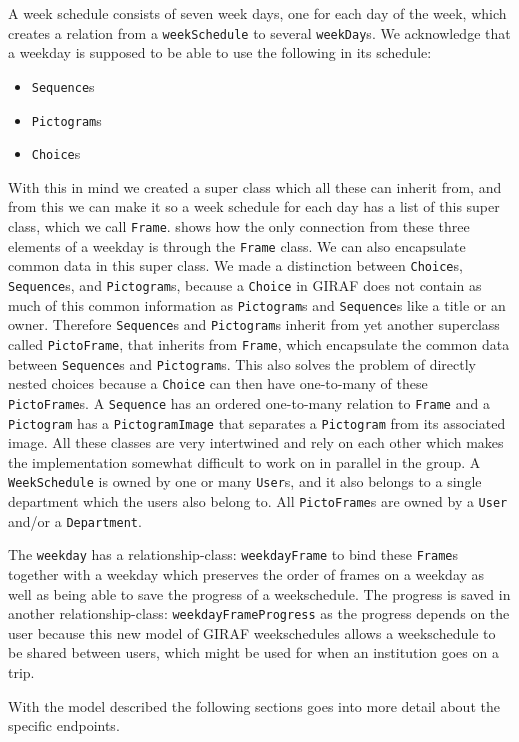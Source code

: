 A week schedule consists of seven week days, one for each day of the week, which creates a relation from a \texttt{weekSchedule} to several \texttt{weekDay}s.
We acknowledge that a weekday is supposed to be able to use the following in its schedule: 

\begin{itemize}
	\item \texttt{Sequence}s
	\item \texttt{Pictogram}s
	\item \texttt{Choice}s
\end{itemize}

With this in mind we created a super class which all these can inherit from, and from this we can make it so a week schedule for each day has a list of this super class, which we call \texttt{Frame}.
 shows how the only connection from these three elements of a weekday is through the \texttt{Frame} class.
We can also encapsulate common data in this super class.
We made a distinction between \texttt{Choice}s, \texttt{Sequence}s, and \texttt{Pictogram}s, because a \texttt{Choice} in GIRAF does not contain as much of this common information as \texttt{Pictogram}s and \texttt{Sequence}s like a title or an owner.
Therefore \texttt{Sequence}s and \texttt{Pictogram}s inherit from yet another superclass called \texttt{PictoFrame}, that inherits from \texttt{Frame}, which encapsulate the common data between \texttt{Sequence}s and \texttt{Pictogram}s.
This also solves the problem of directly nested choices because a \texttt{Choice} can then have one-to-many of these \texttt{PictoFrame}s.
A \texttt{Sequence} has an ordered one-to-many relation to \texttt{Frame} and a \texttt{Pictogram} has a \texttt{PictogramImage} that separates a \texttt{Pictogram} from its associated image.
All these classes are very intertwined and rely on each other which makes the implementation somewhat difficult to work on in parallel in the group.
A \texttt{WeekSchedule} is owned by one or many \texttt{User}s, and it also belongs to a single department which the users also belong to.
All \texttt{PictoFrame}s are owned by a \texttt{User} and/or a \texttt{Department}.

The \texttt{weekday} has a relationship-class: \texttt{weekdayFrame} to bind these \texttt{Frame}s together with a weekday which preserves the order of frames on a weekday as well as being able to save the progress of a weekschedule.
The progress is saved in another relationship-class: \texttt{weekdayFrameProgress} as the progress depends on the user because this new model of GIRAF weekschedules allows a weekschedule to be shared between users, which might be used for when an institution goes on a trip.

With the model described the following sections goes into more detail about the specific endpoints.
